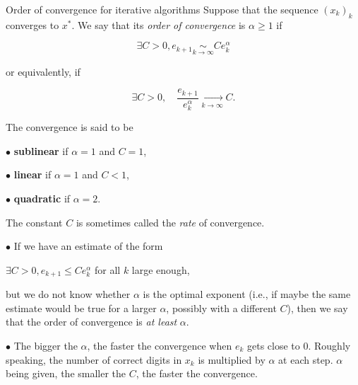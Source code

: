 \documentclass{article}
\begin{document}
        \begin{definition}{Order of convergence for iterative algorithms}
            Suppose that the sequence $(x_k)_k$ converges to $x^*$. We say that its \textit{order of convergence} is $\alpha \geq 1$ if 

            $$\exists C > 0, e_{k+1} \underset{k\to\infty}{\sim} C e_k^\alpha$$

            or equivalently, if
            
            $$
            \exists C>0,  \quad{} \frac{e_{k+1}}{e_k^\alpha} \underset{k\to\infty}{\rightarrow} C.
            $$


            The convergence is said to be
            
            \hspace{20pt}$\bullet$ \textbf{sublinear} if $\alpha=1$ and $C=1$,
            
            \hspace{20pt}$\bullet$ \textbf{linear} if $\alpha=1$ and $C<1$,
            
            \hspace{20pt}$\bullet$ \textbf{quadratic} if $\alpha=2$.
            \vspace{4pt}
            
            The constant $C$ is sometimes called the \textit{rate} of convergence. 
        \end{definition}

        \vspace{10pt}

        \begin{remark}
            $\bullet$ If we have an estimate of the form
            \vspace{4pt}

            \centerline{$\exists C > 0, e_{k+1} \leq C e^\alpha_k$ for all $k$ large enough,}

            \vspace{4pt}

            but we do not know whether $\alpha$ is the optimal exponent (i.e., if maybe the same estimate would be true for a larger $\alpha$, possibly with a different $C$), then we say that the order of convergence is \textit{at least} $\alpha$.

            \vspace{6pt}
                
            $\bullet$ The bigger the $\alpha$, the faster the convergence when $e_k$ gets close to $0$. Roughly speaking, the number of correct digits in $x_k$ is multiplied by $\alpha$ at each step. $\alpha$ being given, the smaller the $C$, the faster the convergence.
        \end{remark}
\end{document}
